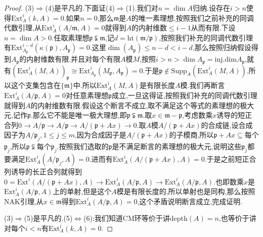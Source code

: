 \begin{proof}
	(3)$\Rightarrow$(4)是平凡的.下面证(4)$\Rightarrow$(1).我们对$n=\dim A$归纳.设存在$i>n$使得$\mathrm{Ext}_A^i(k,A)=0$.如果$n=0$,那么$\mathfrak{m}$是$A$的唯一素理想,按照我们之前补充的同调代数引理,从$\mathrm{Ext}_A^i(A/\mathfrak{m},A)=0$就得到$A$的内射维数$\le i-1$从而有限.下设$n=\dim A>0$.任取素理想$\mathfrak{p}\subsetneqq\mathfrak{m}$,记$d=\mathrm{ht}(\mathfrak{m}/\mathfrak{p})$,按照我们补充的同调代数引理有$\mathrm{Ext}^{i-d}_{A_{\mathfrak{p}}}(\kappa(\mathfrak{p}),A_{\mathfrak{p}})=0$.这里$\dim(A_{\mathfrak{p}})\le n-d<i-d$,那么按照归纳假设得到$A_{\mathfrak{p}}$的内射维数有限.并且对每个有限$A$模$M$,按照$i>n>\dim A_{\mathfrak{p}}=\mathrm{inj.dim}A_{\mathfrak{p}}$,就有$(\mathrm{Ext}_A^i(M,A))_{\mathfrak{p}}\cong\mathrm{Ext}_{A_{\mathfrak{p}}}^i(M_{\mathfrak{p}},A_{\mathfrak{p}})=0$.于是$\mathfrak{p}\not\in\mathrm{Supp}_A(\mathrm{Ext}_A^i(M,A))$.所以这个支集包含在$\{\mathfrak{m}\}$中.所以$\mathrm{Ext}_A^i(M,A)$是有限长度$A$模.我们再断言$\mathrm{Ext}_A^i(A/\mathfrak{p},A)=0$对任意素理想$\mathfrak{p}$成立,一旦这得证,按照我们补充的同调代数引理就得到$A$的内射维数有限.假设这个断言不成立,取不满足这个等式的素理想的极大元,记作$\mathfrak{p}$.那么它不能是唯一极大理想,即$\mathfrak{p}\subsetneqq\mathfrak{m}$.取$x\in\mathfrak{m}-\mathfrak{p}$,考虑数乘$x$诱导的短正合列$0\to A/\mathfrak{p}\to A/\mathfrak{p}\to A/(\mathfrak{p}+Ax)\to0$.取$A$模$A/(\mathfrak{p}+Ax)$的合成链,设合成因子为$A/\mathfrak{p}_j,1\le j\le m$,因为合成因子是$A/(\mathfrak{p}+Ax)$的子模商,所以$\mathfrak{p}+Ax\subseteq$每个$\mathfrak{p}_j$,所以$\mathfrak{p}\subsetneqq$每个$\mathfrak{p}_j$.按照我们选取的$\mathfrak{p}$是不满足断言的素理想的极大元,说明这些$\mathfrak{p}_j$都要满足$\mathrm{Ext}_A^i(A/\mathfrak{p}_j,A)=0$.进而有$\mathrm{Ext}_A^i(A/(\mathfrak{p}+Ax),A)=0$.于是之前短正合列诱导的长正合列就得到$0=\mathrm{Ext}^i(A/(\mathfrak{p}+Ax),A)\to\mathrm{Ext}_A^i(A/\mathfrak{p},A)\to\mathrm{Ext}_A^i(A/\mathfrak{p},A)$.也即数乘$x$是$\mathrm{Ext}_A^i(A/\mathfrak{p},A)$上的单射,但是这个$A$模是有限长度的,所以单射也是同构,那么按照NAK引理,从$x\in\mathfrak{m}$得到$\mathrm{Ext}_A^i(A/\mathfrak{p},A)=0$,这个矛盾说明断言成立,完成证明.
	
	\qquad
	
	(3)$\Rightarrow$(5)是平凡的.(5)$\Leftrightarrow$(6):我们知道CM环等价于讲$\mathrm{depth}(A)=n$,也等价于讲对每个$i<n$有$\mathrm{Ext}_A^i(k,A)=0$.
	
	\qquad
	

\end{proof}
